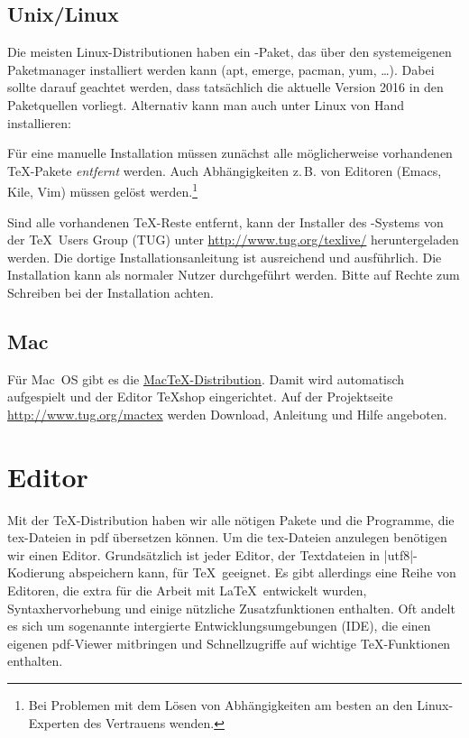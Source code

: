 \documentclass[
	datum=17.10.2016,
]{../tex/latexkurs-exercise}
\begin{document}
\subsection*{Unix/Linux}

Die meisten Linux-Distributionen haben ein \TeXlive-Paket, das über den systemeigenen Paketmanager installiert werden kann (apt, emerge, pacman, yum, …).
Dabei sollte darauf geachtet werden, dass tatsächlich die aktuelle Version 2016 in den Paketquellen vorliegt. Alternativ kann man \TeXlive auch unter Linux von Hand installieren:


Für eine manuelle Installation müssen zunächst alle möglicherweise vorhandenen \TeX-Pakete \emph{entfernt} werden. Auch Abhängigkeiten z.\,B. von Editoren (Emacs, Kile, Vim) müssen gelöst werden.\footnote{Bei Problemen mit dem Lösen von Abhängigkeiten am besten an den Linux-Experten des Vertrauens wenden.}

Sind alle vorhandenen \TeX-Reste entfernt, kann der Installer des \TeXlive-Systems von der \TeX\ Users Group (TUG) unter \url{http://www.tug.org/texlive/} heruntergeladen werden. Die dortige Installationsanleitung ist ausreichend und ausführlich. Die Installation kann als normaler Nutzer durchgeführt werden. Bitte auf Rechte zum Schreiben bei der Installation achten.

\enlargethispage{\baselineskip}

\subsection*{Mac}
Für Mac~OS gibt es die \href{http://www.tug.org/mactex}{Mac\TeX-Distribution}. Damit wird automatisch  \TeXlive aufgespielt und  der Editor \TeX shop eingerichtet. Auf der Projektseite \url{http://www.tug.org/mactex} werden Download, Anleitung und Hilfe angeboten.


\newpage

\section{Editor}

Mit der \TeX-Distribution haben wir alle nötigen Pakete und die Programme, die tex-Dateien in pdf übersetzen können. Um die tex-Dateien anzulegen benötigen wir einen Editor. Grundsätzlich ist jeder Editor, der Textdateien in |utf8|-Kodierung abspeichern kann, für \TeX\ geeignet. Es gibt allerdings eine Reihe von Editoren, die extra für die Arbeit mit \LaTeX\ entwickelt wurden, Syntaxhervorhebung und einige nützliche Zusatzfunktionen enthalten. Oft andelt es sich um sogenannte intergierte Entwicklungsumgebungen (IDE), die einen eigenen pdf-Viewer mitbringen und Schnellzugriffe auf wichtige \TeX-Funktionen enthalten.
\end{document}
